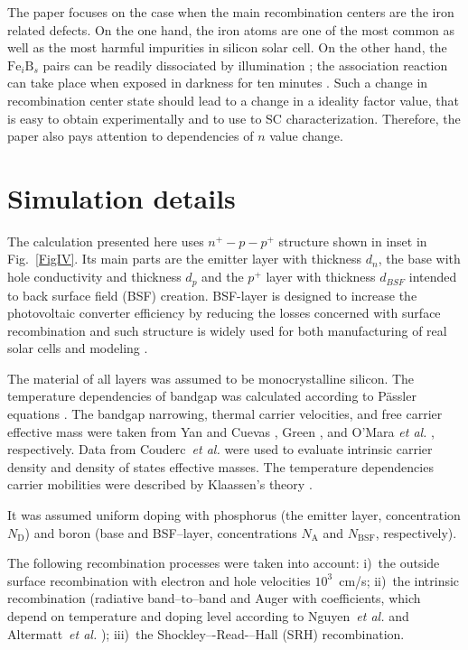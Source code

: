 ﻿\documentclass[12pt]{article}
\begin{document}
The paper focuses on the case when the main recombination centers are the iron related defects.
On the one hand, the iron atoms  are one of the most common as well as the most harmful impurities in silicon solar cell.
On the other hand, the $\mathrm{Fe}_i\mathrm{B}_s$ pairs can be readily dissociated by illumination \cite{FeB:Schmidt};
the association reaction can take place when exposed in darkness for ten minutes \cite{FeB:kinetic}.
Such a change in recombination center state should lead to a change in a ideality factor value,
that is easy to obtain experimentally and to use to SC characterization.
Therefore, the paper also pays attention to dependencies of $n$ value change.

\section{Simulation details}

The calculation presented here uses $n^+-p-p^+$ structure shown in inset in Fig.~\ref{FigIV}.
Its main parts are the emitter layer with thickness $d_n$, the base with hole conductivity and thickness $d_p$
and the $p^+$ layer with thickness $d_{BSF}$ intended to back surface field (BSF) creation.
BSF-layer is designed to increase the photovoltaic converter efficiency by reducing the losses concerned with surface recombination
and such structure is widely used for both manufacturing of real solar cells and modeling \cite{SCAPSuseSi4,SCAPSuseSi1,SCAPSuseSi5}.

The material of all layers was assumed to be monocrystalline silicon.
The temperature dependencies of bandgap was calculated according to P\"assler equations \cite{Pasler}.
The bandgap narrowing, thermal carrier velocities,
and  free carrier effective mass
were taken from Yan and Cuevas \cite{EgNarrow}, Green \cite{Nc:Green}, and O'Mara \emph{et al.} \cite{OMara}, respectively.
Data from Couderc~\emph{et al.} \cite{Si_ni_Couderc} were used to evaluate intrinsic carrier density and density of states effective masses.
The temperature dependencies carrier mobilities were described by Klaassen's theory \cite{KLAASSEN953,Hull}.

It was assumed uniform doping with phosphorus (the emitter layer, concentration $N_\mathrm{D}$)
and boron (base and BSF--layer, concentrations $N_\mathrm{A}$ and $N_\mathrm{BSF}$, respectively).

The following recombination processes were taken into account:
i)~the outside surface recombination with electron and hole velocities $10^3$~cm/s;
ii)~the intrinsic recombination (radiative band--to--band and Auger with coefficients,
which depend on temperature and doping level according
to Nguyen~\emph{et al.} \cite{Si_BtB} and Altermatt~\emph{et al.} \cite{Si_Auger});
iii)~the Shockley–-Read-–Hall (SRH) recombination.
\end{document}
